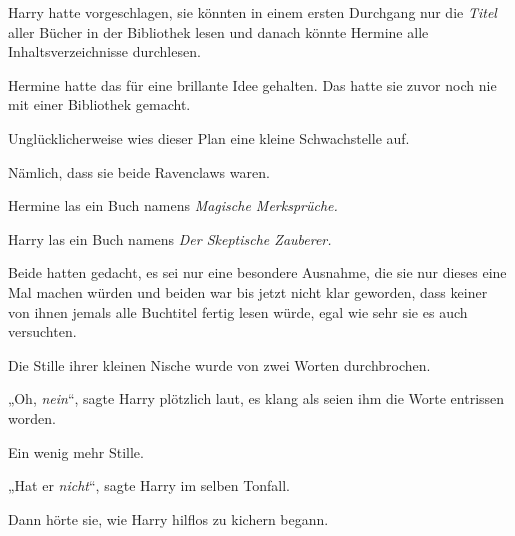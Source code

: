 Harry hatte vorgeschlagen, sie könnten in einem ersten Durchgang nur die \emph{Titel} aller Bücher in der Bibliothek lesen und danach könnte Hermine alle Inhaltsverzeichnisse durchlesen.

Hermine hatte das für eine brillante Idee gehalten. Das hatte sie zuvor noch nie mit einer Bibliothek gemacht.

Unglücklicherweise wies dieser Plan eine kleine Schwachstelle auf.

Nämlich, dass sie beide Ravenclaws waren.

Hermine las ein Buch namens \emph{Magische Merksprüche.}

Harry las ein Buch namens \emph{Der Skeptische Zauberer.}

Beide hatten gedacht, es sei nur eine besondere Ausnahme, die sie nur dieses eine Mal machen würden und beiden war bis jetzt nicht klar geworden, dass keiner von ihnen jemals alle Buchtitel fertig lesen würde, egal wie sehr sie es auch versuchten.

Die Stille ihrer kleinen Nische wurde von zwei Worten durchbrochen.

„Oh, \emph{nein}“, sagte Harry plötzlich laut, es klang als seien ihm die Worte entrissen worden.

Ein wenig mehr Stille.

„Hat er \emph{nicht}“, sagte Harry im selben Tonfall.

Dann hörte sie, wie Harry hilflos zu kichern begann.

